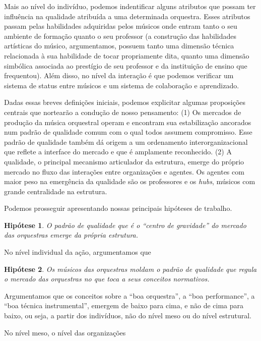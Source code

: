 \documentclass[a4paper, 12pt, openright, oneside, german, french, english, brazil]{abntex2}
\begin{document}
	Mais ao nível do indivíduo, podemos indentificar alguns atributos que possam ter influência na qualidade atribuída a uma determinada orquestra. Esses atributos passam pelas habilidades adquiridas pelos músicos onde entram tanto o seu ambiente de formação quanto o seu professor (a construção das habilidades artísticas do músico, argumentamos, possuem tanto uma dimensão técnica relacionada à sua habilidade de tocar propriamente dita, quanto uma dimensão simbólica associada ao prestígio de seu professor e da instituição de ensino que frequentou). Além disso, no nível da interação é que podemos verificar um sistema de status entre músicos e um sistema de colaboração e aprendizado.

	Dadas essas breves definições iniciais, podemos explicitar algumas proposições centrais que nortearão a condução de nosso pensamento: (1) Os mercados de produção da música orquestral operam e encontram sua estabilização ancorados num padrão de qualidade comum com o qual todos assumem compromisso. Esse padrão de qualidade também dá origem a um ordenamento interorganizacional que reflete a interface do mercado e que é amplamente reconhecido. (2) A qualidade, o principal mecanismo articulador da estrutura, emerge do próprio mercado no fluxo das interações entre organizações e agentes. Os agentes com maior peso na emergência da qualidade são os professores e os \textit{hubs}, músicos com grande centralidade na estrutura.

	Podemos prosseguir apresentando nossas principais hipóteses de trabalho.

	\newtheorem{hip}{Hipótese}

	\begin{hip}
		O padrão de qualidade que é o ``centro de gravidade'' do mercado das orquestras emerge da própria estrutura.
	\end{hip}

	No nível individual da ação, argumentamos que

	\begin{hip}
		Os músicos das orquestras moldam o padrão de qualidade que regula o mercado das orquestras no que toca a seus conceitos normativos.
	\end{hip}

	Argumentamos que os conceitos sobre a ``boa orquestra'', a ``boa performance'', a ``boa técnica instrumental'', emergem de baixo para cima, e não de cima para baixo, ou seja, a partir dos indivíduos, não do nível meso ou do nível estrutural.

	No nível meso, o nível das organizações
\end{document}
